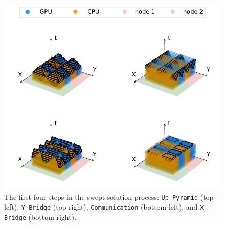 \documentclass[mca,article,submit,moreauthors,pdftex]{Definitions/mdpi}
\def\Up{\texttt{Up-Pyramid}}
\def\Xb{\texttt{X-Bridge}}
\def\Yb{\texttt{Y-Bridge}}
\begin{document}
\begin{figure}[htbp]
    \widefigure
    \includegraphics{figs/SubsPlot1.pdf}
    \caption{The first four steps in the swept solution process: \Up{} (top left), \Yb{} (top right), \texttt{Communication} (bottom left), and \Xb{} (bottom right).}
    \label{fig:MainOne}
\end{figure}
\end{document}
